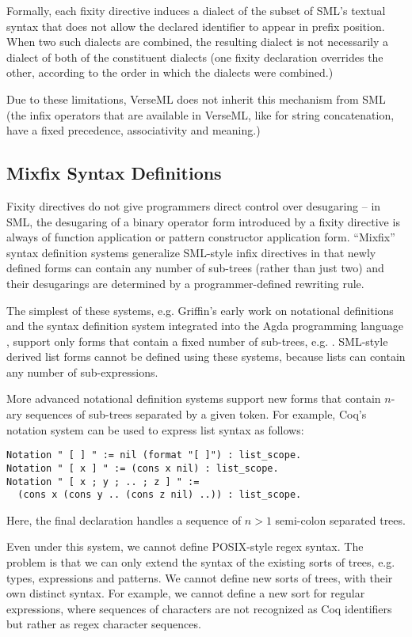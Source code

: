 Formally, each fixity directive induces a dialect of the subset of SML's textual syntax that does not allow the declared identifier to appear in prefix position. When two such dialects are combined, the resulting dialect is not necessarily a dialect of both of the constituent dialects (one fixity declaration overrides the other, according to the order in which the dialects were combined.)

Due to these limitations, VerseML does not inherit this mechanism from SML (the infix operators that are available in VerseML, like \li{^} for string concatenation, have a fixed precedence, associativity and meaning.)

\subsection{Mixfix Syntax Definitions}
Fixity directives do not give programmers direct control over desugaring -- in SML, the desugaring of a binary operator form introduced by a fixity directive is always of function application or pattern constructor application form. ``Mixfix'' syntax definition systems generalize SML-style infix directives in that newly defined forms can contain any number of sub-trees (rather than just two) and their desugarings are determined by a programmer-defined rewriting rule. 

The simplest of these systems, e.g. Griffin's early work on notational definitions \cite{5134} and the syntax definition system integrated into the Agda programming language \cite{DBLP:conf/ifl/DanielssonN08}, support only forms that contain a fixed number of sub-trees, e.g. . SML-style derived list forms cannot be defined using these systems, because lists can contain any number of sub-expressions.

More advanced notational definition systems support new forms that contain $n$-ary sequences of sub-trees separated by a given token. For example, Coq's notation system \cite{Coq:manual} can be used to express list syntax as follows:
\begin{lstlisting}[numbers=none]
Notation " [ ] " := nil (format "[ ]") : list_scope.
Notation " [ x ] " := (cons x nil) : list_scope.
Notation " [ x ; y ; .. ; z ] " := 
  (cons x (cons y .. (cons z nil) ..)) : list_scope.
\end{lstlisting}
Here, the final declaration handles a sequence of $n > 1$ semi-colon separated trees.

Even under this system, we cannot define POSIX-style regex syntax. The problem is that we can only extend the syntax of the existing sorts of trees, e.g. types, expressions and patterns. We cannot define new sorts of trees, with their own distinct syntax. For example, we cannot define a new sort for regular expressions, where sequences of characters are not recognized as Coq identifiers but rather as regex character sequences. 

